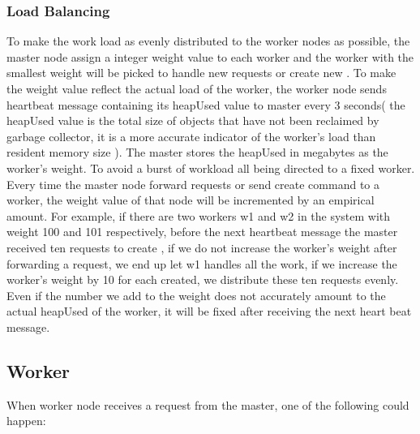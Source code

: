 \requestdispatchdiagram{}

\subsubsection{Load Balancing}
To make the work load as evenly distributed to the worker nodes as possible,
the master node assign a integer weight value to each worker
and the worker with the smallest weight will be picked to handle new requests
or create new \appins{}.
To make the weight value reflect the actual load of the worker,
the worker node sends heartbeat message containing 
its heapUsed value to master every 3 seconds(
the heapUsed value is the total size of \js{} objects that have not been
reclaimed by garbage collector, 
it is a more accurate indicator of the worker's load than resident memory size
).
The master stores the heapUsed in megabytes as the worker's weight.
To avoid a burst of workload all being directed to a fixed worker.
Every time the master node forward requests or send create \appins{} command to a worker,
the weight value of that node will be incremented by an empirical amount.
For example, if there are two workers w1 and w2 in the system with weight
100 and 101 respectively,
before the next heartbeat message the master received ten requests to 
create \appins{},
if we do not increase the worker's weight after forwarding a request,
we end up let w1 handles all the work,
if we increase the worker's weight by 10 for each \appins{} created,
we distribute these ten requests evenly.
Even if the number we add to the weight does not accurately amount to the actual 
heapUsed of the worker, it will be fixed after receiving the next heart beat message.

\subsection{Worker}
\label{sec:worker}
When worker node receives a request from the master,
one of the following could happen:

